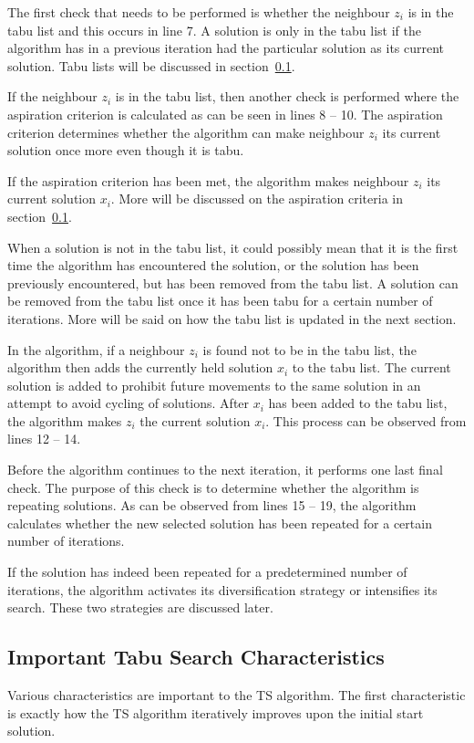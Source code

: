 The first check that needs to be performed is whether the neighbour $z_i$ is in the tabu list and this occurs in line 7. A solution is only in the tabu list if the algorithm has in a previous iteration had the particular solution as its current solution. Tabu lists will be discussed in section~\ref{sec:TScharacteristics}.

If the neighbour $z_i$ is in the tabu list, then another check is performed where the aspiration criterion is calculated as can be seen in lines 8 -- 10. The aspiration criterion determines whether the algorithm can make neighbour $z_i$ its current solution once more even though it is tabu. 

If the aspiration criterion has been met, the algorithm makes neighbour $z_i$ its current solution $x_i$. More will be discussed on the aspiration criteria in section~\ref{sec:TScharacteristics}.

When a solution is not in the tabu list, it could possibly mean that it is the first time the algorithm has encountered the solution, or the solution has been previously encountered, but has been removed from the tabu list. A solution can be removed from the tabu list once it has been tabu for a certain number of iterations. More will be said on how the tabu list is updated in the next section.

In the algorithm, if a neighbour $z_i$ is found not to be in the tabu list, the algorithm then adds the currently held solution $x_i$ to the tabu list. The current solution is added to prohibit future movements to the same solution in an attempt to avoid cycling of solutions. After $x_i$ has been added to the tabu list, the algorithm makes $z_i$ the current solution $x_i$. This process can be observed from lines 12 -- 14.

Before the algorithm continues to the next iteration, it performs one last final check. The purpose of this check is to determine whether the algorithm is repeating solutions. As can be observed from lines 15 -- 19, the algorithm calculates whether the new selected solution has been repeated for a certain number of iterations. 

If the solution has indeed been repeated for a predetermined number of iterations, the algorithm activates its diversification strategy or intensifies its search. These two strategies are discussed later.

\subsection{Important Tabu Search Characteristics}
\label{sec:TScharacteristics}
Various characteristics are important to the TS algorithm. The first characteristic is exactly how the TS algorithm iteratively improves upon the initial start solution.

